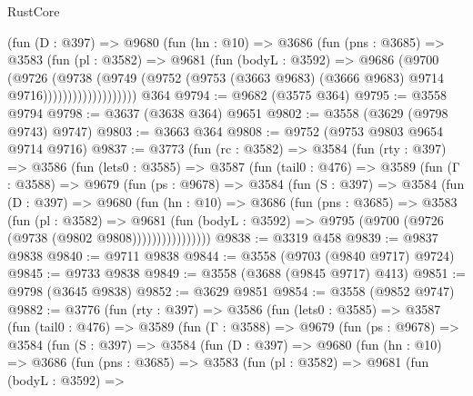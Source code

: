 \begin{lexlean}{RustCore}
\begin{coremodule}
                    (fun (D : @397) =>
                    @9680
                      (fun (hn : @10) =>
                      @3686
                        (fun (pns : @3685) =>
                        @3583
                          (fun (pl : @3582) =>
                          @9681
                            (fun (bodyL : @3592) =>
                            @9686
                              (@9700
                                (@9726
                                  (@9738
                                    (@9749
                                      (@9752
                                        (@9753
                                          (@3663 @9683)
                                          (@3666 @9683)
                                          @9714
                                          @9716)))))))))))))))))))
    @364
@9794 := @9682 (@3575 @364)
@9795 := @3558 @9794
@9798 := @3637 (@3638 @364) @9651
@9802 := @3558 (@3629 (@9798 @9743) @9747)
@9803 := @3663 @364
@9808 := @9752 (@9753 @9803 @9654 @9714 @9716)
@9837 := @3773
    (fun (rc : @3582) =>
    @3584
      (fun (rty : @397) =>
      @3586
        (fun (lets0 : @3585) =>
        @3587
          (fun (tail0 : @476) =>
          @3589
            (fun (Γ : @3588) =>
            @9679
              (fun (ps : @9678) =>
              @3584
                (fun (S : @397) =>
                @3584
                  (fun (D : @397) =>
                  @9680
                    (fun (hn : @10) =>
                    @3686
                      (fun (pns : @3685) =>
                      @3583
                        (fun (pl : @3582) =>
                        @9681
                          (fun (bodyL : @3592) =>
                          @9795 (@9700 (@9726 (@9738 (@9802 @9808))))))))))))))))
@9838 := @3319 @458
@9839 := @9837 @9838
@9840 := @9711 @9838
@9844 := @3558 (@9703 (@9840 @9717) @9724)
@9845 := @9733 @9838
@9849 := @3558 (@3688 (@9845 @9717) @413)
@9851 := @9798 (@3645 @9838)
@9852 := @3629 @9851
@9854 := @3558 (@9852 @9747)
@9882 := @3776
    (fun (rty : @397) =>
    @3586
      (fun (lets0 : @3585) =>
      @3587
        (fun (tail0 : @476) =>
        @3589
          (fun (Γ : @3588) =>
          @9679
            (fun (ps : @9678) =>
            @3584
              (fun (S : @397) =>
              @3584
                (fun (D : @397) =>
                @9680
                  (fun (hn : @10) =>
                  @3686
                    (fun (pns : @3685) =>
                    @3583
                      (fun (pl : @3582) =>
                      @9681
                        (fun (bodyL : @3592) =>

\end{coremodule}
\end{lexlean}
